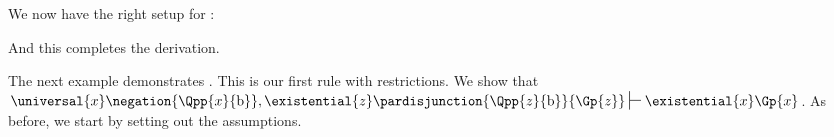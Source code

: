 We now have the right setup for :
\begin{gproof}[\label{GQDExampleG}]
\end{gproof}
And this completes the derivation. 

The next example demonstrates . 
This is our first rule with restrictions.
We show that $\universal{\variable{x}}\negation{\Qpp{\variable{x}}{\constant{b}}},\existential{\variable{z}}\pardisjunction{\Qpp{\variable{z}}{\constant{b}}}{\Gp{\variable{z}}}\sststile{}{}\existential{\variable{x}}\Gp{\variable{x}}$.
As before, we start by setting out the assumptions. 
\begin{gproof}[\label{GQDExampleH}]
\end{gproof}

